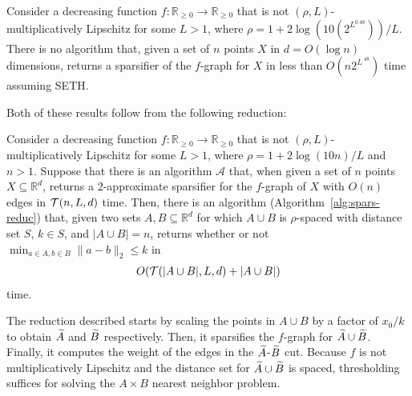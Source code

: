 \begin{theorem}\label{thm:high-spars-hard}
Consider a decreasing function $f:\mathbb{R}_{\ge 0}\rightarrow \mathbb{R}_{\ge 0}$ 
that is not $(\rho,L)$-multiplicatively Lipschitz for some $L > 1$, where $\rho = 1 + 2\log (10 (2^{L^{0.48}}))/L$. There is no algorithm that, given a set of $n$ points $X$ in $d = O(\log n)$ dimensions, returns a sparsifier of the $f$-graph for $X$ in less than $O(n 2^{L^{.48}})$ time assuming {\sf SETH}.
\end{theorem}

Both of these results follow from the following reduction:

\begin{lemma}\label{lem:spars-reduc}
Consider a decreasing function $f:\mathbb{R}_{\ge 0}\rightarrow \mathbb{R}_{\ge 0}$ that is not $(\rho,L)$-multiplicatively Lipschitz for some $L > 1$, where $\rho = 1 + 2\log (10 n ) /L$ and $n > 1$. Suppose that there is an algorithm $\mathcal A$ that, when given a set of $n$ points $X\subseteq \mathbb{R}^d$, returns a 2-approximate sparsifier for the $f$-graph of $X$ with $O( n )$ edges in $\mathcal{T}(n, L, d)$ time. Then, there is an algorithm (Algorithm~\ref{alg:spars-reduc}) that, given two sets $A,B\subseteq \mathbb{R}^d$ for which $A\cup B$ is $\rho$-spaced with distance set $S$, $k\in S$, and $|A \cup B| = n$, returns whether or not $\min_{a\in A, b\in B} \|a - b\|_2 \le k$ in 
\begin{align*}
O(\mathcal{T}(|A\cup B|,L,d) + |A \cup B|)
\end{align*}
time.
\end{lemma}
The reduction described starts by scaling the points in $A \cup B$ by a factor of $x_0/k$ to obtain $\widetilde{A}$ and $\widetilde{B}$ respectively. Then, it sparsifies the $f$-graph for $\widetilde{A} \cup \widetilde{B}$. Finally, it computes the weight of the edges in the $\widetilde{A}$-$\widetilde{B}$ cut. Because $f$ is not multiplicatively Lipschitz and the distance set for $\widetilde{A} \cup \widetilde{B}$ is spaced, thresholding suffices for solving the $A\times B$ nearest neighbor problem.

